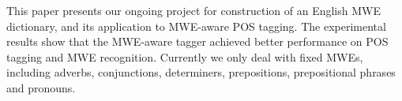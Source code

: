This paper presents our ongoing project for construction of an English MWE dictionary, and its application to MWE-aware POS tagging.
 The experimental results show that the MWE-aware tagger achieved
 better performance on POS tagging and MWE recognition. Currently we only deal
 with fixed MWEs, including adverbs, conjunctions, determiners, prepositions,
 prepositional phrases and pronouns.

